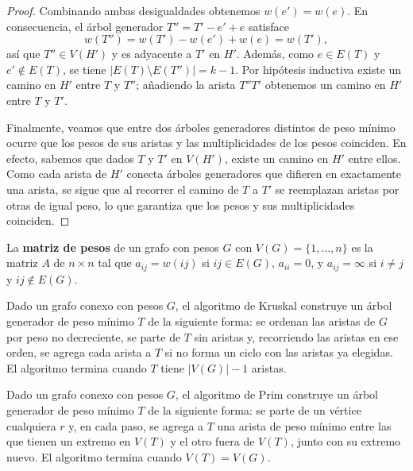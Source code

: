 \begin{proof}
    Combinando ambas desigualdades obtenemos \( w(e') = w(e) \). En consecuencia, el árbol generador \( T'' = T' - e' + e \) satisface
    \[
        w(T'') = w(T') - w(e') + w(e) = w(T'),
    \]
    así que \( T'' \in V(H') \) y es adyacente a \( T' \) en \( H' \). Además, como \( e \in E(T) \) y \( e' \notin E(T) \), se tiene \( |E(T) \setminus E(T'')| = k - 1 \). Por hipótesis inductiva existe un camino en \( H' \) entre \( T \) y \( T'' \); añadiendo la arista \( T''T' \) obtenemos un camino en \( H' \) entre \( T \) y \( T' \).

    Finalmente, veamos que entre dos árboles generadores distintos de peso mínimo ocurre que los pesos de sus aristas y las multiplicidades de los pesos coinciden. En efecto, sabemos que dados \( T \) y \( T' \) en \( V(H') \), existe un camino en \( H' \) entre ellos. Como cada arista de \( H' \) conecta árboles generadores que difieren en exactamente una arista, se sigue que al recorrer el camino de \( T \) a \( T' \) se reemplazan aristas por otras de igual peso, lo que garantiza que los pesos y sus multiplicidades coinciden.
\end{proof}

\vspace{0.5cm}

\begin{definition}
    La \textbf{matriz de pesos} de un grafo con pesos \( G \) con \( V(G) = \{1, \ldots, n\} \) es la matriz \( A \) de \( n \times n \) tal que \( a_{ij} = w(ij) \) si \( ij \in E(G) \), \( a_{ii} = 0 \), y \( a_{ij} = \infty \) si \( i \neq j \) y \( ij \notin E(G) \).
\end{definition}

\begin{definition}
    Dado un grafo conexo con pesos \( G \), el algoritmo de Kruskal construye un árbol generador de peso mínimo \( T \) de la siguiente forma: se ordenan las aristas de \( G \) por peso no decreciente, se parte de \( T \) sin aristas y, recorriendo las aristas en ese orden, se agrega cada arista a \( T \) si no forma un ciclo con las aristas ya elegidas. El algoritmo termina cuando \( T \) tiene \( |V(G)| - 1 \) aristas.
\end{definition}

\begin{definition}
    Dado un grafo conexo con pesos \( G \), el algoritmo de Prim construye un árbol generador de peso mínimo \( T \) de la siguiente forma: se parte de un vértice cualquiera \( r \) y, en cada paso, se agrega a \( T \) una arista de peso mínimo entre las que tienen un extremo en \( V(T) \) y el otro fuera de \( V(T) \), junto con su extremo nuevo. El algoritmo termina cuando \( V(T) = V(G) \).
\end{definition}

